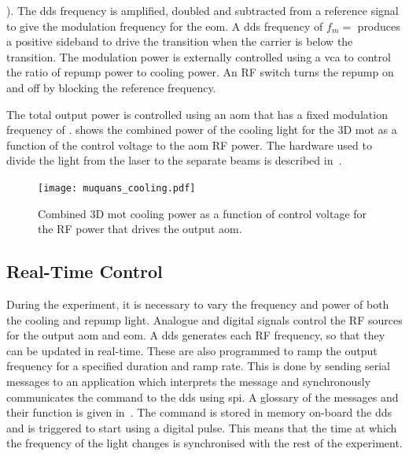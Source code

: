 ). The \ac{dds} frequency is amplified, doubled and subtracted
from a  reference signal to give the
modulation frequency for the \ac{eom}. A \ac{dds} frequency of $f_m
=$ produces a positive sideband to drive the
 transition when the carrier is  below
the  transition. The modulation power is externally controlled using a \ac{vca} to control the ratio of
repump power to cooling power. An RF switch turns the repump on and off by blocking the reference frequency. 
\par\noindent 
The total output power is controlled using an
\ac{aom} that has a fixed modulation frequency of
.  shows
the combined power of the cooling light for the 3D \ac{mot} as a
function of the control voltage to the \ac{aom}
RF power. The hardware used to divide the light from the laser to the
separate beams is described in~.
\begin{figure}[htpb]
  \centering
  \texttt{[image: muquans\_cooling.pdf]}
  \caption[Cooling power vs. \ac{aom} control voltage.]{Combined
  3D \ac{mot} cooling power as a function of control voltage for the
  RF power that drives the
\Muquans output \ac{aom}.}
  \label{fig:muquans_cooling}
\end{figure}
\subsection{Real-Time Control} \label{subsec:muquans_comm}
During the experiment, it is necessary to vary the frequency and power
of both
the cooling and repump light.
Analogue and digital signals control the RF sources for the output
\ac{aom} and
\ac{eom}. A \ac{dds} generates each RF frequency, so that they can be
updated in real-time.
These are also
programmed to ramp the output frequency for a specified duration and
ramp rate. This is done by sending serial messages to an
application which interprets the message and synchronously communicates the command to the \ac{dds} using
\ac{spi}. A glossary of the messages and their function is given
in~. The command is stored in memory
on-board the \ac{dds} and
is triggered to start using a digital pulse. This means that the time at
which the frequency of the light changes is synchronised with the rest
of the experiment. 
